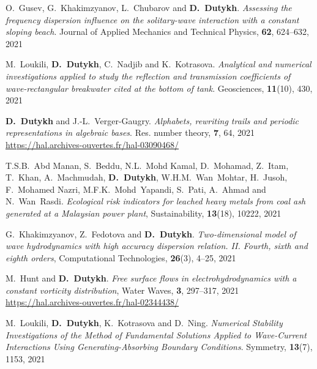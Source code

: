\documentclass[final, a4paper, oneside, 12pt]{article}
\numberwithin{equation}{section}
\begin{document}
\begin{etaremune}
  
  \item O.~Gusev, G.~Khakimzyanov, L.~Chubarov and \textbf{D.~Dutykh}. \textit{Assessing the frequency dispersion influence on the solitary-wave interaction with a constant sloping beach}. Journal of Applied Mechanics and Technical Physics, \textbf{62}, 624--632, 2021 %
  
  \item M.~Loukili, \textbf{D.~Dutykh}, C.~Nadjib and K.~Kotrasova. \textit{Analytical and numerical investigations applied to study the reflection and transmission coefficients of wave-rectangular breakwater cited at the bottom of tank}. Geosciences, \textbf{11}(10), 430, 2021 %
  
  \item \textbf{D.~Dutykh} and J.-L.~Verger-Gaugry. \textit{Alphabets, rewriting trails and periodic representations in algebraic bases}. Res. number theory, \textbf{7}, 64, 2021 \\ %
  \url{https://hal.archives-ouvertes.fr/hal-03090468/}
  
  \item T.S.B.~Abd Manan, S.~Beddu, N.L.~Mohd Kamal, D.~Mohamad, Z.~Itam, T.~Khan, A.~Machmudah, \textbf{D.~Dutykh}, W.H.M.~Wan~Mohtar, H.~Jusoh, F.~Mohamed Nazri, M.F.K.~Mohd~Yapandi, S.~Pati, A.~Ahmad and N.~Wan~Rasdi. \textit{Ecological risk indicators for leached heavy metals from coal ash generated at a Malaysian power plant}, Sustainability, \textbf{13}(18), 10222, 2021 %
  
  \item G.~Khakimzyanov, Z.~Fedotova and \textbf{D.~Dutykh}. \textit{Two-dimensional model of wave hydrodynamics with high accuracy dispersion relation. II. Fourth, sixth and eighth orders}, Computational Technologies, \textbf{26}(3), 4--25, 2021 %
  
  \item M.~Hunt and \textbf{D.~Dutykh}. \textit{Free surface flows in electrohydrodynamics with a constant vorticity distribution}, Water Waves, \textbf{3}, 297--317, 2021 \\ %
  \url{https://hal.archives-ouvertes.fr/hal-02344438/}
  
  \item M.~Loukili, \textbf{D.~Dutykh}, K.~Kotrasova and D.~Ning. \textit{Numerical Stability Investigations of the Method of Fundamental Solutions Applied to Wave-Current Interactions Using Generating-Absorbing Boundary Conditions}. Symmetry, \textbf{13}(7), 1153, 2021 %
  

\end{etaremune}
\end{document}
